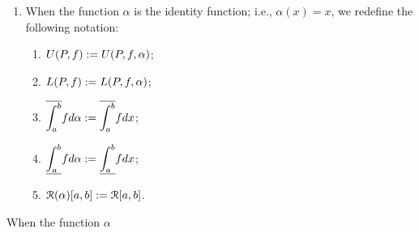 \begin{definition}
\begin{enumerate}[label = (\arabic*),itemsep=1pt,topsep=3pt]
                \item When the function $\alpha$ is the identity function; i.e., $\alpha(x) = x$, we redefine the following notation:
                    \begin{enumerate}[label = (\roman*),itemsep=6pt,topsep=3pt]
                        \item $\displaystyle U(P,f) := U(P,f,\alpha)$;
                        \item $\displaystyle L(P,f) := L(P,f,\alpha)$;
                        \item $\displaystyle \overline{\int_a^b} f d \alpha := \overline{\int_a^b} f d x$;
                        \item $\displaystyle \underline{\int_a^b} f d \alpha := \underline{\int_a^b} f d x$;
                        \item $\mathcal{R}(\alpha)[a,b] := \mathcal{R}[a,b]$.
                    \end{enumerate}
            \end{enumerate}

        \begin{definition}
            When the function $\alpha$
        \end{definition}
    \end{definition}